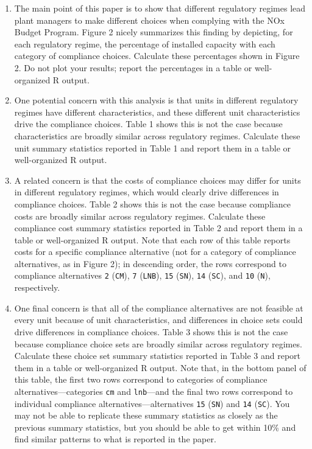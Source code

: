 \documentclass[11pt,letterpaper]{article}
\begin{document}
\begin{enumerate}[label=\alph*., leftmargin=*]
	\item The main point of this paper is to show that different regulatory regimes lead plant managers to make different choices when complying with the NOx Budget Program. Figure 2 nicely summarizes this finding by depicting, for each regulatory regime, the percentage of installed capacity with each category of compliance choices. Calculate these percentages shown in Figure 2. Do not plot your results; report the percentages in a table or well-organized R output.

	\item One potential concern with this analysis is that units in different regulatory regimes have different characteristics, and these different unit characteristics drive the compliance choices. Table 1 shows this is not the case because characteristics are broadly similar across regulatory regimes. Calculate these unit summary statistics reported in Table 1 and report them in a table or well-organized R output.

	\item A related concern is that the costs of compliance choices may differ for units in different regulatory regimes, which would clearly drive differences in compliance choices. Table 2 shows this is not the case because compliance costs are broadly similar across regulatory regimes. Calculate these compliance cost summary statistics reported in Table 2 and report them in a table or well-organized R output. Note that each row of this table reports costs for a specific compliance alternative (not for a category of compliance alternatives, as in Figure 2); in descending order, the rows correspond to compliance alternatives \texttt{2} (\texttt{CM}), \texttt{7} (\texttt{LNB}), \texttt{15} (\texttt{SN}), \texttt{14} (\texttt{SC}), and \texttt{10} (\texttt{N}), respectively.

	\item One final concern is that all of the compliance alternatives are not feasible at every unit because of unit characteristics, and differences in choice sets could drive differences in compliance choices. Table 3 shows this is not the case because compliance choice sets are broadly similar across regulatory regimes. Calculate these choice set summary statistics reported in Table 3 and report them in a table or well-organized R output. Note that, in the bottom panel of this table, the first two rows correspond to categories of compliance alternatives---categories \texttt{cm} and \texttt{lnb}---and the final two rows correspond to individual compliance alternatives---alternatives \texttt{15} (\texttt{SN}) and \texttt{14} (\texttt{SC}). You may not be able to replicate these summary statistics as closely as the previous summary statistics, but you should be able to get within 10\% and find similar patterns to what is reported in the paper.
\end{enumerate}
\end{document}
